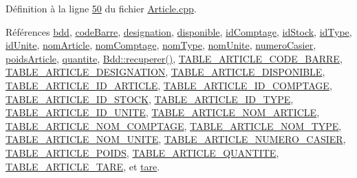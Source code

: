 Définition à la ligne \hyperlink{_article_8cpp_source_l00050}{50} du fichier \hyperlink{_article_8cpp_source}{Article.\+cpp}.



Références \hyperlink{_article_8h_source_l00082}{bdd}, \hyperlink{_article_8h_source_l00090}{code\+Barre}, \hyperlink{_article_8h_source_l00091}{designation}, \hyperlink{_article_8h_source_l00093}{disponible}, \hyperlink{_article_8h_source_l00088}{id\+Comptage}, \hyperlink{_article_8h_source_l00083}{id\+Stock}, \hyperlink{_article_8h_source_l00086}{id\+Type}, \hyperlink{_article_8h_source_l00096}{id\+Unite}, \hyperlink{_article_8h_source_l00085}{nom\+Article}, \hyperlink{_article_8h_source_l00089}{nom\+Comptage}, \hyperlink{_article_8h_source_l00087}{nom\+Type}, \hyperlink{_article_8h_source_l00097}{nom\+Unite}, \hyperlink{_article_8h_source_l00098}{numero\+Casier}, \hyperlink{_article_8h_source_l00094}{poids\+Article}, \hyperlink{_article_8h_source_l00092}{quantite}, \hyperlink{_bdd_8cpp_source_l00187}{Bdd\+::recuperer()}, \hyperlink{_article_8h_source_l00038}{T\+A\+B\+L\+E\+\_\+\+A\+R\+T\+I\+C\+L\+E\+\_\+\+C\+O\+D\+E\+\_\+\+B\+A\+R\+RE}, \hyperlink{_article_8h_source_l00039}{T\+A\+B\+L\+E\+\_\+\+A\+R\+T\+I\+C\+L\+E\+\_\+\+D\+E\+S\+I\+G\+N\+A\+T\+I\+ON}, \hyperlink{_article_8h_source_l00041}{T\+A\+B\+L\+E\+\_\+\+A\+R\+T\+I\+C\+L\+E\+\_\+\+D\+I\+S\+P\+O\+N\+I\+B\+LE}, \hyperlink{_article_8h_source_l00032}{T\+A\+B\+L\+E\+\_\+\+A\+R\+T\+I\+C\+L\+E\+\_\+\+I\+D\+\_\+\+A\+R\+T\+I\+C\+LE}, \hyperlink{_article_8h_source_l00036}{T\+A\+B\+L\+E\+\_\+\+A\+R\+T\+I\+C\+L\+E\+\_\+\+I\+D\+\_\+\+C\+O\+M\+P\+T\+A\+GE}, \hyperlink{_article_8h_source_l00031}{T\+A\+B\+L\+E\+\_\+\+A\+R\+T\+I\+C\+L\+E\+\_\+\+I\+D\+\_\+\+S\+T\+O\+CK}, \hyperlink{_article_8h_source_l00034}{T\+A\+B\+L\+E\+\_\+\+A\+R\+T\+I\+C\+L\+E\+\_\+\+I\+D\+\_\+\+T\+Y\+PE}, \hyperlink{_article_8h_source_l00044}{T\+A\+B\+L\+E\+\_\+\+A\+R\+T\+I\+C\+L\+E\+\_\+\+I\+D\+\_\+\+U\+N\+I\+TE}, \hyperlink{_article_8h_source_l00033}{T\+A\+B\+L\+E\+\_\+\+A\+R\+T\+I\+C\+L\+E\+\_\+\+N\+O\+M\+\_\+\+A\+R\+T\+I\+C\+LE}, \hyperlink{_article_8h_source_l00037}{T\+A\+B\+L\+E\+\_\+\+A\+R\+T\+I\+C\+L\+E\+\_\+\+N\+O\+M\+\_\+\+C\+O\+M\+P\+T\+A\+GE}, \hyperlink{_article_8h_source_l00035}{T\+A\+B\+L\+E\+\_\+\+A\+R\+T\+I\+C\+L\+E\+\_\+\+N\+O\+M\+\_\+\+T\+Y\+PE}, \hyperlink{_article_8h_source_l00045}{T\+A\+B\+L\+E\+\_\+\+A\+R\+T\+I\+C\+L\+E\+\_\+\+N\+O\+M\+\_\+\+U\+N\+I\+TE}, \hyperlink{_article_8h_source_l00046}{T\+A\+B\+L\+E\+\_\+\+A\+R\+T\+I\+C\+L\+E\+\_\+\+N\+U\+M\+E\+R\+O\+\_\+\+C\+A\+S\+I\+ER}, \hyperlink{_article_8h_source_l00042}{T\+A\+B\+L\+E\+\_\+\+A\+R\+T\+I\+C\+L\+E\+\_\+\+P\+O\+I\+DS}, \hyperlink{_article_8h_source_l00040}{T\+A\+B\+L\+E\+\_\+\+A\+R\+T\+I\+C\+L\+E\+\_\+\+Q\+U\+A\+N\+T\+I\+TE}, \hyperlink{_article_8h_source_l00043}{T\+A\+B\+L\+E\+\_\+\+A\+R\+T\+I\+C\+L\+E\+\_\+\+T\+A\+RE}, et \hyperlink{_article_8h_source_l00095}{tare}.


